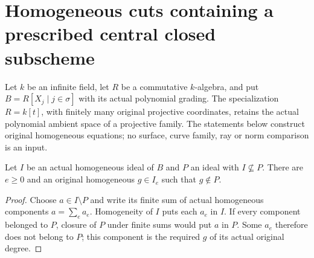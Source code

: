 \section{Homogeneous cuts containing a prescribed central closed subscheme}
Let $k$ be an infinite field, let $R$ be a commutative $k$-algebra,
and put $B=R[X_j\mid j\in\sigma]$ with its actual polynomial grading.
The specialization $R=k[t]$, with finitely many original projective
coordinates, retains the actual polynomial ambient space of a projective
family. The statements below construct original homogeneous equations;
no surface, curve family, ray or norm comparison is an input.

\begin{lemma}
\label{lem:pl-gauss-homogeneous-ideal-nonvanishing-witness}
\leanok
Let $I$ be an actual homogeneous ideal of $B$ and $P$ an ideal with
$I\not\subseteq P$. There are $e\ge0$ and an original homogeneous
$g\in I_e$ such that $g\notin P$.
\end{lemma}
\begin{proof}
Choose $a\in I\setminus P$ and write its finite sum of actual homogeneous
components $a=\sum_e a_e$. Homogeneity of $I$ puts each $a_e$ in $I$.
If every component belonged to $P$, closure of $P$ under finite sums
would put $a$ in $P$. Some $a_e$ therefore does not belong to $P$;
this component is the required $g$ of its actual original degree.
\end{proof}

